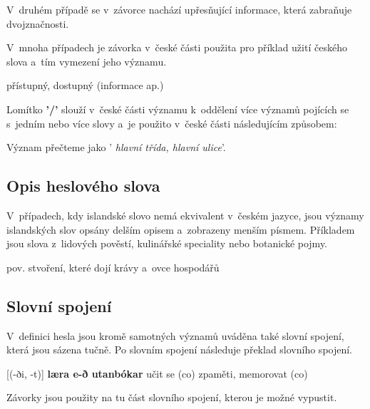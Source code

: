 \blspace
  \dicEntry {}   
\blspace

V~druhém případě se v~závorce nachází upřesňující informace, která zabraňuje dvojznačnosti.

\blspace
  \dicEntry {}    {\footnotesize {}}
\blspace

V~mnoha případech je závorka v~české části použita pro příklad užití českého slova a~tím vymezení jeho významu.

\blspace
  \dicEntry {}  {přístupný, dostupný (informace ap.)}
\blspace

Lomítko \textbf{'/'} slouží v~české části významu k~oddělení více významů pojících se s~jedním nebo více slovy a~je použito v~české části následujícím způsobem:

\blspace
  \dicEntry {}   
\blspace

Význam přečteme jako ' \textit{hlavní třída, hlavní ulice}'.

\subsection*{Opis heslového slova}

V~případech, kdy islandské slovo nemá ekvivalent v~českém jazyce, jsou významy islandských slov opsány delším opisem a~zobrazeny menším písmem. Příkladem jsou slova z~lidových pověstí, kulinářské speciality nebo botanické pojmy.

\blspace
  \dicEntry {}   {\footnotesize{pov.}} {\footnotesize{stvoření, které dojí krávy a~ovce hospodářů}}
\blspace

\subsection*{Slovní spojení}

V~definici hesla jsou kromě samotných významů uváděna také slovní spojení, která jsou sázena tučně. Po slovním spojení následuje překlad slovního spojení.

\blspace
  \dicEntry {} [(-ði, -t)] \textbf{læra e-ð utanbókar} {učit se (co) zpaměti, memorovat (co)}
\blspace

Závorky jsou použity na tu část slovního spojení, kterou je možné vypustit.

